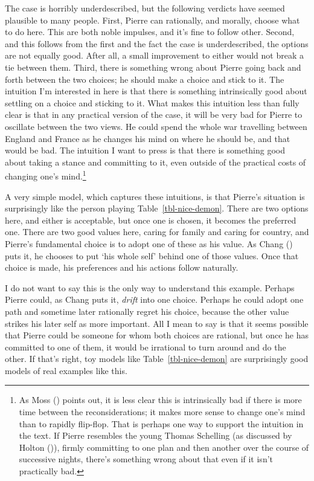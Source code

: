 \documentclass[
  11pt,
  letterpaper,
  DIV=11,
  numbers=noendperiod,
  twoside]{scrartcl}
\begin{document}
The case is horribly underdescribed, but the following verdicts have
seemed plausible to many people. First, Pierre can rationally, and
morally, choose what to do here. This are both noble impulses, and it's
fine to follow other. Second, and this follows from the first and the
fact the case is underdescribed, the options are not equally good. After
all, a small improvement to either would not break a tie between them.
Third, there is something wrong about Pierre going back and forth
between the two choices; he should make a choice and stick to it. The
intuition I'm interested in here is that there is something
intrinsically good about settling on a choice and sticking to it. What
makes this intuition less than fully clear is that in any practical
version of the case, it will be very bad for Pierre to oscillate between
the two views. He could spend the whole war travelling between England
and France as he changes his mind on where he should be, and that would
be bad. The intuition I want to press is that there is something good
about taking a stance and committing to it, even outside of the
practical costs of changing one's mind.\footnote{As Moss
  () points out, it is less clear this is
  intrinsically bad if there is more time between the reconsiderations;
  it makes more sense to change one's mind than to rapidly flip-flop.
  That is perhaps one way to support the intuition in the text. If
  Pierre resembles the young Thomas Schelling (as discussed by Holton
  ()), firmly committing to one plan and
  then another over the course of successive nights, there's something
  wrong about that even if it isn't practically bad.}

A very simple model, which captures these intuitions, is that Pierre's
situation is surprisingly like the person playing
Table~\ref{tbl-nice-demon}. There are two options here, and either is
acceptable, but once one is chosen, it becomes the preferred one. There
are two good values here, caring for family and caring for country, and
Pierre's fundamental choice is to adopt one of these as his value. As
Chang () puts it, he chooses to put `his
whole self' behind one of those values. Once that choice is made, his
preferences and his actions follow naturally.

I do not want to say this is the only way to understand this example.
Perhaps Pierre could, as Chang puts it, \emph{drift} into one choice.
Perhaps he could adopt one path and sometime later rationally regret his
choice, because the other value strikes his later self as more
important. All I mean to say is that it seems possible that Pierre could
be someone for whom both choices are rational, but once he has committed
to one of them, it would be irrational to turn around and do the other.
If that's right, toy models like Table~\ref{tbl-nice-demon} are
surprisingly good models of real examples like this.
\end{document}
